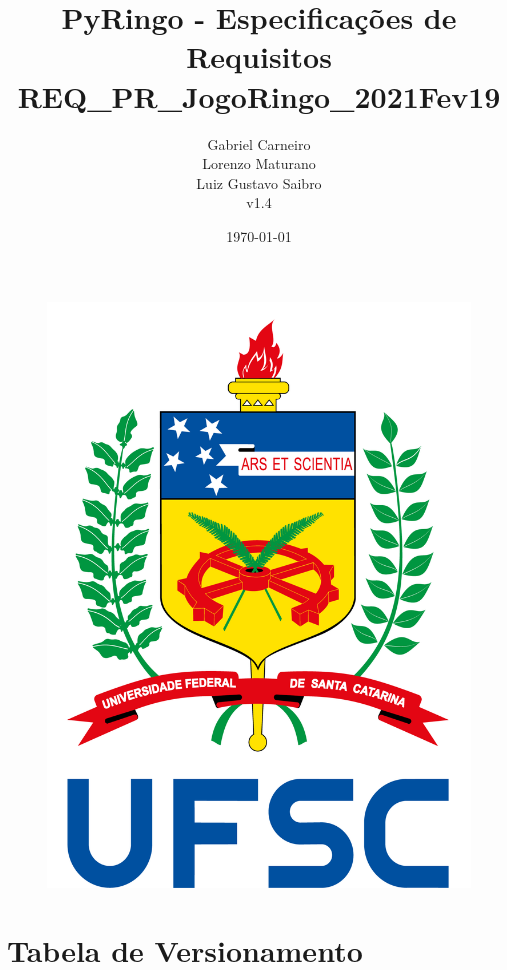\documentclass[12pt]{article}
\title{
    PyRingo - Especificações de Requisitos
    \\REQ\_PR\_JogoRingo\_2021Fev19
}
\author{Gabriel Carneiro\\Lorenzo Maturano\\Luiz Gustavo Saibro\\
v1.4}
\date{\today}
\begin{document}
\begin{figure}
    \includegraphics[scale=0.3]{logo-ufsc}
    \centering
    \label{fig:logo-ufsc}
\end{figure}

\maketitle

\newpage

\section*{Tabela de Versionamento}

\end{document}
